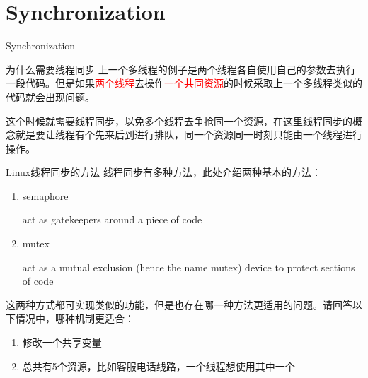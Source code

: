 \documentclass{beamer}
\begin{document}
\section{Synchronization}
\begin{frame}
\Huge{\centerline{Synchronization}}
\end{frame}
\begin{frame}{为什么需要线程同步}
上一个多线程的例子是两个线程各自使用自己的参数去执行一段代码。但是如果\textcolor{red}{两个线程}去操作\textcolor{red}{一个共同资源}的时候采取上一个多线程类似的代码就会出现问题。

这个时候就需要线程同步，以免多个线程去争抢同一个资源，在这里线程同步的概念就是要让线程有个先来后到进行排队，同一个资源同一时刻只能由一个线程进行操作。
\end{frame}
\begin{frame}{Linux线程同步的方法}
线程同步有多种方法，此处介绍两种基本的方法：
\begin{enumerate}
\item
semaphore

act as gatekeepers around a piece of code
\item
mutex

act as a mutual exclusion (hence the name mutex) device to protect sections of code
\end{enumerate}
这两种方式都可实现类似的功能，但是也存在哪一种方法更适用的问题。请回答以下情况中，哪种机制更适合：
\begin{enumerate}
\item
修改一个共享变量
\item
总共有5个资源，比如客服电话线路，一个线程想使用其中一个
\end{enumerate}
\end{frame}
\end{document}

